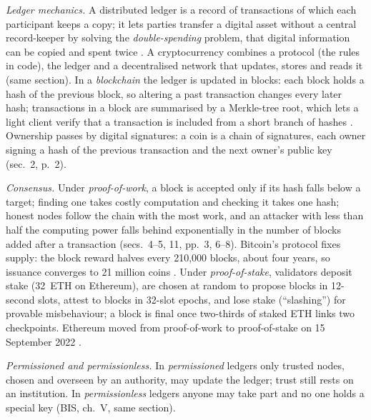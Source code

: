 \begin{qfdefinition}\label{def:distributed-ledger-applications}
 \emph{Ledger mechanics.} A distributed ledger is a record of transactions of which each participant keeps a copy; it lets parties transfer a digital asset without a central record-keeper by solving the \emph{double-spending} problem, that digital information can be copied and spent twice \citep[ch.~V, ``Distributed ledger technology in cryptocurrencies'']{bis-aer-2018-cryptocurrencies}. A cryptocurrency combines a protocol (the rules in code), the ledger and a decentralised network that updates, stores and reads it (same section). In a \emph{blockchain} the ledger is updated in blocks: each block holds a hash of the previous block, so altering a past transaction changes every later hash; transactions in a block are summarised by a Merkle-tree root, which lets a light client verify that a transaction is included from a short branch of hashes \citep[secs.~3, 7--8, pp.~2--5]{s6-bitcoin}. Ownership passes by digital signatures: a coin is a chain of signatures, each owner signing a hash of the previous transaction and the next owner's public key (sec.~2, p.~2).

\emph{Consensus.} Under \emph{proof-of-work}, a block is accepted only if its hash falls below a target; finding one takes costly computation and checking it takes one hash; honest nodes follow the chain with the most work, and an attacker with less than half the computing power falls behind exponentially in the number of blocks added after a transaction (secs.~4--5, 11, pp.~3, 6--8). Bitcoin's protocol fixes supply: the block reward halves every 210{,}000 blocks, about four years, so issuance converges to 21 million coins \citep[draft of 9 February 2016, p.~62]{crypto-narayanan}. Under \emph{proof-of-stake}, validators deposit stake (32~ETH on Ethereum), are chosen at random to propose blocks in 12-second slots, attest to blocks in 32-slot epochs, and lose stake (``slashing'') for provable misbehaviour; a block is final once two-thirds of staked ETH links two checkpoints. Ethereum moved from proof-of-work to proof-of-stake on 15 September 2022 \citep[``Proof-of-stake'' and ``The Merge'' pages]{ethereum-pos-2026}.

\emph{Permissioned and permissionless.} In \emph{permissioned} ledgers only trusted nodes, chosen and overseen by an authority, may update the ledger; trust still rests on an institution. In \emph{permissionless} ledgers anyone may take part and no one holds a special key (BIS, ch.~V, same section).


\end{qfdefinition}
